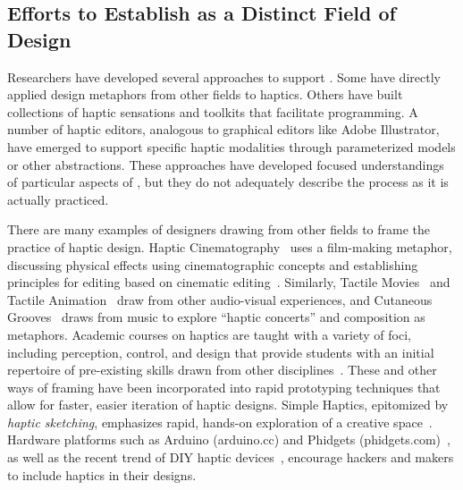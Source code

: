 \subsection{Efforts to Establish \haxd as a Distinct Field of Design}
\noindent
Researchers have developed several approaches to support \haxd.
Some have directly applied design metaphors from other fields to haptics.
Others have built collections of haptic sensations and toolkits that facilitate programming.
A number of haptic editors, analogous to graphical editors like Adobe Illustrator, have emerged to support specific haptic modalities through parameterized models or other abstractions.
These approaches have developed focused understandings of particular aspects of \haxd, but they do not adequately describe the process as it is actually practiced.

There are many examples of designers drawing from other fields to frame the practice of haptic design.
Haptic Cinematography~\citep{Danieau2014} uses a film-making metaphor, discussing physical effects using cinematographic concepts and establishing principles for editing based on cinematic editing~\citep{Guillotel2016}.
Similarly, 
Tactile Movies~\citep{Kim2009} and
Tactile Animation~\citep{Schneider2015}  
draw from other audio-visual experiences, and Cutaneous Grooves~\citep{Gunther2002} draws from music to explore ``haptic concerts'' and composition as metaphors.
Academic courses on haptics are taught with a variety of foci, including perception, control, and design that provide students with an initial repertoire of pre-existing skills drawn from other disciplines~\citep{Okamura2012,Jones2014}.
These and other ways of framing \haxd{} have been incorporated into rapid prototyping techniques that allow for faster, easier iteration of haptic designs.
Simple Haptics, epitomized by \emph{haptic sketching}, emphasizes rapid, hands-on exploration of a creative space~\citep{Moussette2010,Moussette2011}. %
Hardware platforms such as Arduino (arduino.cc) and Phidgets (phidgets.com)~\citep{Greenberg2001}, as well as the recent trend of DIY haptic devices~\citep{Martinez2016,Gallacher2016,Forsslund2015}, encourage hackers and makers to include haptics in their designs.

